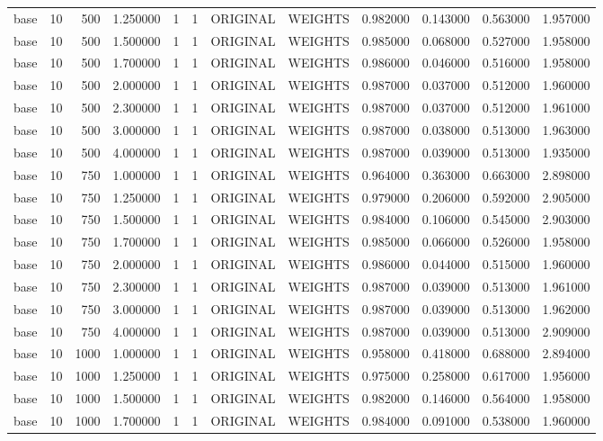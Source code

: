 \begin{tabular}{lrrrllllrrrr}
base & 10 & 500 & 1.250000 & 1 & 1 & ORIGINAL & WEIGHTS & 0.982000 & 0.143000 & 0.563000 & 1.957000 \\
base & 10 & 500 & 1.500000 & 1 & 1 & ORIGINAL & WEIGHTS & 0.985000 & 0.068000 & 0.527000 & 1.958000 \\
base & 10 & 500 & 1.700000 & 1 & 1 & ORIGINAL & WEIGHTS & 0.986000 & 0.046000 & 0.516000 & 1.958000 \\
base & 10 & 500 & 2.000000 & 1 & 1 & ORIGINAL & WEIGHTS & 0.987000 & 0.037000 & 0.512000 & 1.960000 \\
base & 10 & 500 & 2.300000 & 1 & 1 & ORIGINAL & WEIGHTS & 0.987000 & 0.037000 & 0.512000 & 1.961000 \\
base & 10 & 500 & 3.000000 & 1 & 1 & ORIGINAL & WEIGHTS & 0.987000 & 0.038000 & 0.513000 & 1.963000 \\
base & 10 & 500 & 4.000000 & 1 & 1 & ORIGINAL & WEIGHTS & 0.987000 & 0.039000 & 0.513000 & 1.935000 \\
base & 10 & 750 & 1.000000 & 1 & 1 & ORIGINAL & WEIGHTS & 0.964000 & 0.363000 & 0.663000 & 2.898000 \\
base & 10 & 750 & 1.250000 & 1 & 1 & ORIGINAL & WEIGHTS & 0.979000 & 0.206000 & 0.592000 & 2.905000 \\
base & 10 & 750 & 1.500000 & 1 & 1 & ORIGINAL & WEIGHTS & 0.984000 & 0.106000 & 0.545000 & 2.903000 \\
base & 10 & 750 & 1.700000 & 1 & 1 & ORIGINAL & WEIGHTS & 0.985000 & 0.066000 & 0.526000 & 1.958000 \\
base & 10 & 750 & 2.000000 & 1 & 1 & ORIGINAL & WEIGHTS & 0.986000 & 0.044000 & 0.515000 & 1.960000 \\
base & 10 & 750 & 2.300000 & 1 & 1 & ORIGINAL & WEIGHTS & 0.987000 & 0.039000 & 0.513000 & 1.961000 \\
base & 10 & 750 & 3.000000 & 1 & 1 & ORIGINAL & WEIGHTS & 0.987000 & 0.039000 & 0.513000 & 1.962000 \\
base & 10 & 750 & 4.000000 & 1 & 1 & ORIGINAL & WEIGHTS & 0.987000 & 0.039000 & 0.513000 & 2.909000 \\
base & 10 & 1000 & 1.000000 & 1 & 1 & ORIGINAL & WEIGHTS & 0.958000 & 0.418000 & 0.688000 & 2.894000 \\
base & 10 & 1000 & 1.250000 & 1 & 1 & ORIGINAL & WEIGHTS & 0.975000 & 0.258000 & 0.617000 & 1.956000 \\
base & 10 & 1000 & 1.500000 & 1 & 1 & ORIGINAL & WEIGHTS & 0.982000 & 0.146000 & 0.564000 & 1.958000 \\
base & 10 & 1000 & 1.700000 & 1 & 1 & ORIGINAL & WEIGHTS & 0.984000 & 0.091000 & 0.538000 & 1.960000 \\

\end{tabular}
